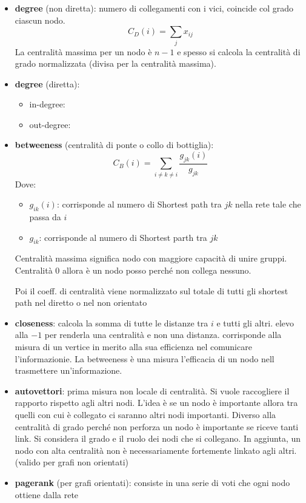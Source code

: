 \begin{itemize}
    \item \textbf{degree} (non diretta): numero di collegamenti con i vici, coincide col grado
    ciascun nodo.
    $$C_D(i) = \sum_j x_{ij}$$
    La centralità massima per un nodo è $n-1$ e spesso si calcola la centralità di 
    grado normalizzata (divisa per la centralità massima).
    \item \textbf{degree} (diretta):
    \begin{itemize}
        \item in-degree:
        \item out-degree:
    \end{itemize}
    \item \textbf{betweeness} (centralità di ponte o collo di bottiglia): 
    $$C_B(i) = \sum_{i\ne k \ne i} \frac{g_{jk}(i)}{g_{jk}}$$
    Dove:
    \begin{itemize}
        \item $g_{ik}(i)$: corrisponde al numero di Shortest path tra $jk$ nella rete tale che 
        passa da $i$
        \item $g_{ik}$: corrisponde al numero di Shortest parth tra $jk$
    \end{itemize}
    Centralità massima significa nodo con maggiore capacità di unire gruppi. Centralità $0$
    allora è un nodo posso perché non collega nessuno.
    
    Poi il coeff. di centralità viene normalizzato sul totale di tutti gli shortest 
    path nel diretto o nel non orientato
    \item \textbf{closeness}: calcola la somma di tutte le distanze tra $i$ e tutti gli altri.
    elevo alla $-1$ per renderla una centralità e non una distanza. corrisponde 
    alla misura di un vertice in merito alla sua efficienza nel comunicare l'informazionie.
    La betweeness è una misura l'efficacia di un nodo nell trasmettere un'informazione.
    \item \textbf{autovettori}: prima misura non locale di centralità. Si vuole 
    raccogliere il rapporto rispetto agli altri nodi. L'idea è se un nodo è
    importante allora tra quelli con cui è collegato ci saranno altri nodi importanti.
    Diverso alla centralità di grado perché non perforza un nodo è importante se 
    riceve tanti link. Si considera il grado e il ruolo dei nodi che si collegano.
    In aggiunta, un nodo con alta centralità non è necessariamente fortemente linkato
    agli altri. (valido per grafi non orientati)
    \item \textbf{pagerank} (per grafi orientati): consiste in una serie di voti
    che ogni nodo ottiene dalla rete


\end{itemize}

